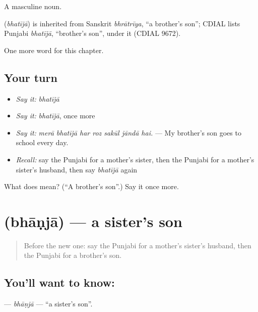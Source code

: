A masculine noun.

\begin{cousinweb}
\textbf{} (\emph{bhatījā}) is inherited from Sanskrit \emph{bhrātrīya}, \textquotedblleft{}a brother's son\textquotedblright{}; CDIAL lists Punjabi \emph{bhatījā}, \textquotedblleft{}brother's son\textquotedblright{}, under it (CDIAL 9672).
\end{cousinweb}

\begin{grammarlens}[title={What you've built}]
One more word for this chapter.
\end{grammarlens}

\subsection*{Your turn}
\begin{itemize}
\raggedright
  \item \emph{Say it:} \emph{bhatījā}
  \item \emph{Say it:} \emph{bhatījā}, once more
  \item \emph{Say it:} \emph{merā bhatījā har roz sakūl jāndā hai.} — My brother's son goes to school every day.
  \item \emph{Recall:} say the Punjabi for a mother's sister, then the Punjabi for a mother's sister's husband, then say \emph{bhatījā} again
\end{itemize}

\begin{tcolorbox}[breakable,colback=teal!4,colframe=teal!35!black,title={Before you move on}]
What does  mean? (\textquotedblleft{}A brother's son\textquotedblright{}.) Say it once more.
\end{tcolorbox}
\section[\texorpdfstring{\pa{ਭਾਣਜਾ} (bhāṇjā)}{ਭਾਣਜਾ (bhāṇjā)}]{ (bhāṇjā) — a sister's son}

\label{lesson:PA-C332-bhanja}



\begin{quote}
Before the new one: say the Punjabi for a mother's sister's husband, then the Punjabi for a brother's son.
\end{quote}

\subsection*{You'll want to know: }
\textbf{} — \emph{bhāṇjā} — \textquotedblleft{}a sister's son\textquotedblright{}.

